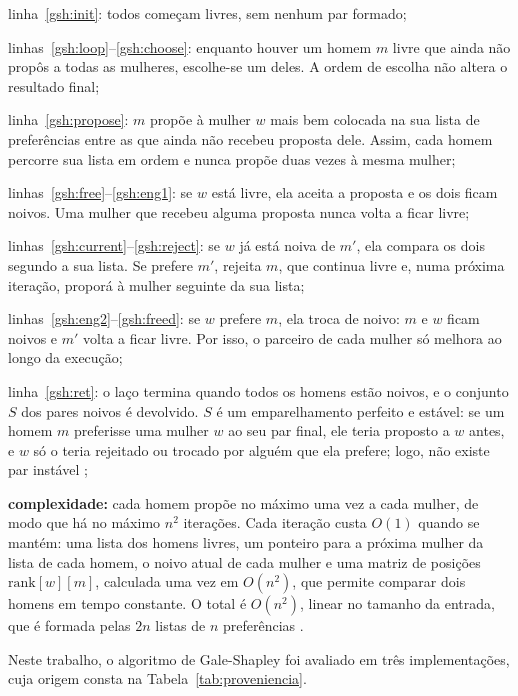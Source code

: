 \begin{alineas}
    \item linha~\ref{gsh:init}: todos começam livres, sem nenhum par formado;
    \item linhas~\ref{gsh:loop}--\ref{gsh:choose}: enquanto houver um homem $m$ livre que ainda não propôs a todas as mulheres, escolhe-se um deles. A ordem de escolha não altera o resultado final;
    \item linha~\ref{gsh:propose}: $m$ propõe à mulher $w$ mais bem colocada na sua lista de preferências entre as que ainda não recebeu proposta dele. Assim, cada homem percorre sua lista em ordem e nunca propõe duas vezes à mesma mulher;
    \item linhas~\ref{gsh:free}--\ref{gsh:eng1}: se $w$ está livre, ela aceita a proposta e os dois ficam noivos. Uma mulher que recebeu alguma proposta nunca volta a ficar livre;
    \item linhas~\ref{gsh:current}--\ref{gsh:reject}: se $w$ já está noiva de $m'$, ela compara os dois segundo a sua lista. Se prefere $m'$, rejeita $m$, que continua livre e, numa próxima iteração, proporá à mulher seguinte da sua lista;
    \item linhas~\ref{gsh:eng2}--\ref{gsh:freed}: se $w$ prefere $m$, ela troca de noivo: $m$ e $w$ ficam noivos e $m'$ volta a ficar livre. Por isso, o parceiro de cada mulher só melhora ao longo da execução;
    \item linha~\ref{gsh:ret}: o laço termina quando todos os homens estão noivos, e o conjunto $S$ dos pares noivos é devolvido. $S$ é um emparelhamento perfeito e estável: se um homem $m$ preferisse uma mulher $w$ ao seu par final, ele teria proposto a $w$ antes, e $w$ só o teria rejeitado ou trocado por alguém que ela prefere; logo, não existe par instável \cite{kleinberg};
    \item \textbf{complexidade:} cada homem propõe no máximo uma vez a cada mulher, de modo que há no máximo $n^2$ iterações. Cada iteração custa $O(1)$ quando se mantém: uma lista dos homens livres, um ponteiro para a próxima mulher da lista de cada homem, o noivo atual de cada mulher e uma matriz de posições $\mathrm{rank}[w][m]$, calculada uma vez em $O(n^2)$, que permite comparar dois homens em tempo constante. O total é $O(n^2)$, linear no tamanho da entrada, que é formada pelas $2n$ listas de $n$ preferências \cite{kleinberg}.
\end{alineas}

Neste trabalho, o algoritmo de Gale-Shapley foi avaliado em três implementações, cuja origem consta na Tabela~\ref{tab:proveniencia}.
